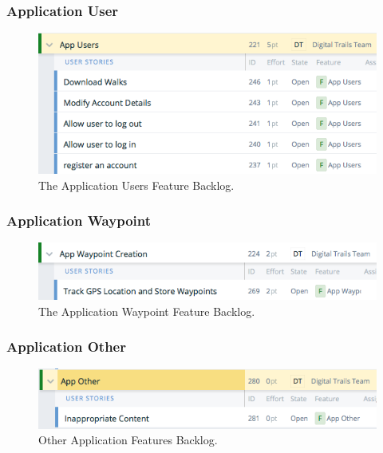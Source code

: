 \documentclass[11pt,a4paper]{article}
\begin{document}
\subsubsection{Application User}
\begin{figure}[H]
\centering
\includegraphics[width = 140mm]{backlog/AppUser.png}
\caption{The Application Users Feature Backlog.}
\label{fig:backlogappuser}
\end{figure}

\subsubsection{Application Waypoint}
\begin{figure}[H]
\centering
\includegraphics[width = 140mm]{backlog/AppWaypoint.png}
\caption{The Application Waypoint Feature Backlog.}
\label{fig:backlogappway}
\end{figure}

\subsubsection{Application Other}
\begin{figure}[H]
\centering
\includegraphics[width = 140mm]{backlog/AppOther.png}
\caption{Other Application Features Backlog.}
\label{fig:backlogappother}
\end{figure}
\end{document}
